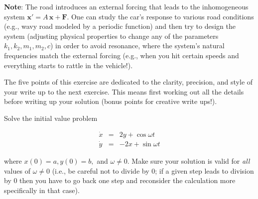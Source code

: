 \documentclass[11pt,letterpaper,boxed]{pset}
\begin{document}
\begin{problem} [Exercise 1.]
        \textbf{Note}: The road introduces an external forcing that leads to the inhomogeneous system $\mathbf{x} ' = A \, \mathbf{x} + \mathbf{F}.$ One can study the car's response to various road conditions (e.g., wavy road modeled by a periodic function) and then try to design the system (adjusting physical properties to change any of the parameters $k_1, k_2, m_1, m_2, c$) in order to avoid resonance, where the system's natural frequencies match the external forcing (e.g., when you hit certain speeds and everything starts to rattle in the vehicle!). 
    \end{problem}
    \newpage
    
    
    \begin{problem} [Exercise 2.]
        The five points of this exercise are dedicated to the clarity, precision, and style of your write up to the next exercise.  This means first working out all the details before writing up your solution (bonus points for creative write ups!). 
    \end{problem}
    
    
    \begin{problem} [Exercise 3.] 
        Solve the initial value problem
        
        \begin{eqnarray*}
            \dot{x} &=& 2 y + \cos \omega t \\
            \dot{y} &= &  - 2 x + \sin \omega t
        \end{eqnarray*}
        
        where $x(0)=a, y(0) =b,$ and $\omega \neq 0$. Make sure your solution is valid for \textit{all} values of $\omega \neq 0$ (i.e., be careful not to divide by $0$; if a given step leads to division by $0$ then you have to go back one step and reconsider the calculation more specifically in that case).  
    \end{problem}
    \newpage
    
\end{document}

